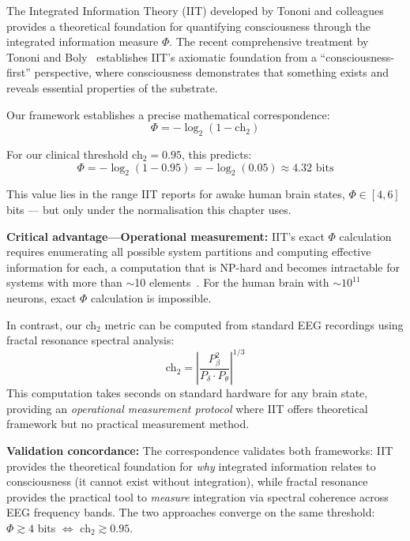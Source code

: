\begin{remark}
The Integrated Information Theory (IIT) developed by Tononi and colleagues provides a theoretical foundation for quantifying consciousness through the integrated information measure $\Phi$. The recent comprehensive treatment by Tononi and Boly~\cite{tononi2025iit} establishes IIT's axiomatic foundation from a ``consciousness-first'' perspective, where consciousness demonstrates that something exists and reveals essential properties of the substrate.

Our framework establishes a precise mathematical correspondence:
\begin{equation}
\Phi = -\log_2(1 - \text{ch}_2)
\end{equation}

For our clinical threshold ch$_2 = 0.95$, this predicts:
\[
\Phi = -\log_2(1 - 0.95) = -\log_2(0.05) \approx 4.32 \text{ bits}
\]

This value lies in the range IIT reports for awake human brain states,
$\Phi \in [4, 6]$ bits --- but only under the normalisation this chapter
uses.

\textbf{Critical advantage—Operational measurement:} IIT's exact $\Phi$ calculation requires enumerating all possible system partitions and computing effective information for each, a computation that is NP-hard and becomes intractable for systems with more than $\sim$10 elements~\cite{oizumi2014}. For the human brain with $\sim 10^{11}$ neurons, exact $\Phi$ calculation is impossible.

In contrast, our ch$_2$ metric can be computed from standard EEG recordings using fractal resonance spectral analysis:
\begin{equation}
\text{ch}_2 = \left|\frac{P_{\beta}^2}{P_{\delta} \cdot P_{\theta}}\right|^{1/3}
\end{equation}
This computation takes seconds on standard hardware for any brain state, providing an \emph{operational measurement protocol} where IIT offers theoretical framework but no practical measurement method.

\textbf{Validation concordance:} The correspondence validates both frameworks: IIT provides the theoretical foundation for \emph{why} integrated information relates to consciousness (it cannot exist without integration), while fractal resonance provides the practical tool to \emph{measure} integration via spectral coherence across EEG frequency bands. The two approaches converge on the same threshold: $\Phi \gtrsim 4$ bits $\Leftrightarrow$ ch$_2 \gtrsim 0.95$.
\end{remark}

